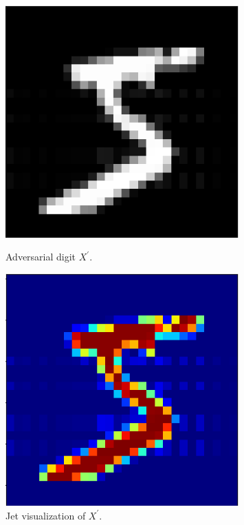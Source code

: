 \documentclass{beamer}
\begin{document}
\begin{frame}
\begin{figure}[H]
	\begin{minipage}[t]{0.3\linewidth}
		\centering
		\includegraphics[width=0.8\textwidth]{img/advrows/5adv.png}
			\caption{\small Adversarial digit $X^\prime$.}
	\end{minipage}        
	\hspace{.1cm}
	\begin{minipage}[t]{0.3\linewidth}
		\centering
		\includegraphics[width=0.8\textwidth]{img/advrows/5advjet.png}
		\caption{\small Jet visualization of $X^\prime$.}
	\end{minipage}

\end{figure}
\end{frame}
\end{document}
